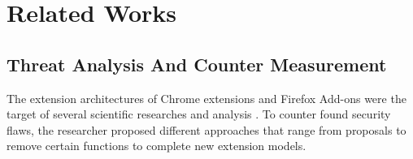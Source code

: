 
\chapter{Related Works}

\section{Threat Analysis And Counter Measurement}
	
	The extension architectures of Chrome extensions and Firefox Add-ons were the target of several scientific researches and analysis \cite{Barth10protectingbrowsers,Carlini:2012:EGC:2362793.2362800,Hallaraker:2005:DMJ:1078029.1078861,Liu12chromeextensions:,TerLouw:2007:EWB:1420581.1420583,cs2015sentinel}. To counter found security flaws, the researcher proposed different approaches that range from proposals to remove certain functions to complete new extension models. 
	
